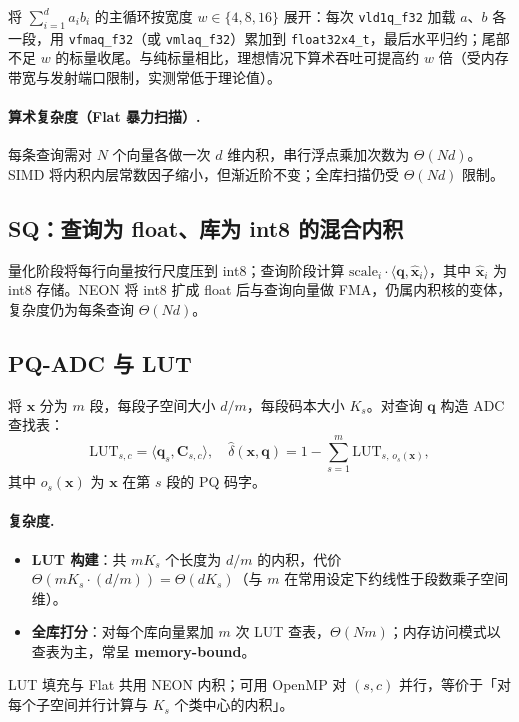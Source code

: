 \documentclass[UTF8,a4paper,11pt]{ctexart}
\begin{document}
将 $\sum_{i=1}^d a_i b_i$ 的主循环按宽度 $w\in\{4,8,16\}$ 展开：每次 \texttt{vld1q\_f32} 加载 $a$、$b$ 各一段，用 \texttt{vfmaq\_f32}（或 \texttt{vmlaq\_f32}）累加到 \texttt{float32x4\_t}，最后水平归约；尾部不足 $w$ 的标量收尾。与纯标量相比，理想情况下算术吞吐可提高约 $w$ 倍（受内存带宽与发射端口限制，实测常低于理论值）。

\paragraph{算术复杂度（Flat 暴力扫描）.}
每条查询需对 $N$ 个向量各做一次 $d$ 维内积，串行浮点乘加次数为 $\Theta(Nd)$。SIMD 将内积内层常数因子缩小，但渐近阶不变；全库扫描仍受 $\Theta(Nd)$ 限制。

\subsection{SQ：查询为 float、库为 int8 的混合内积}

量化阶段将每行向量按行尺度压到 int8；查询阶段计算 $\mathrm{scale}_i\cdot \langle \mathbf{q},\hat{\mathbf{x}}_i\rangle$，其中 $\hat{\mathbf{x}}_i$ 为 int8 存储。NEON 将 int8 扩成 float 后与查询向量做 FMA，仍属内积核的变体，复杂度仍为每条查询 $\Theta(Nd)$。

\subsection{PQ-ADC 与 LUT}

将 $\mathbf{x}$ 分为 $m$ 段，每段子空间大小 $d/m$，每段码本大小 $K_s$。对查询 $\mathbf{q}$ 构造 ADC 查找表：
\begin{equation}
  \mathrm{LUT}_{s,c} = \langle \mathbf{q}_s, \mathbf{C}_{s,c}\rangle,\quad
  \hat{\delta}(\mathbf{x},\mathbf{q}) = 1 - \sum_{s=1}^{m} \mathrm{LUT}_{s,\,o_s(\mathbf{x})},
\end{equation}
其中 $o_s(\mathbf{x})$ 为 $\mathbf{x}$ 在第 $s$ 段的 PQ 码字。

\paragraph{复杂度.}
\begin{itemize}[leftmargin=*]
  \item \textbf{LUT 构建}：共 $m K_s$ 个长度为 $d/m$ 的内积，代价 $\Theta(m K_s \cdot (d/m))=\Theta(d K_s)$（与 $m$ 在常用设定下约线性于段数乘子空间维）。
  \item \textbf{全库打分}：对每个库向量累加 $m$ 次 LUT 查表，$\Theta(N m)$；内存访问模式以查表为主，常呈 \textbf{memory-bound}。
\end{itemize}
LUT 填充与 Flat 共用 NEON 内积；可用 OpenMP 对 $(s,c)$ 并行，等价于「对每个子空间并行计算与 $K_s$ 个类中心的内积」。
\end{document}

